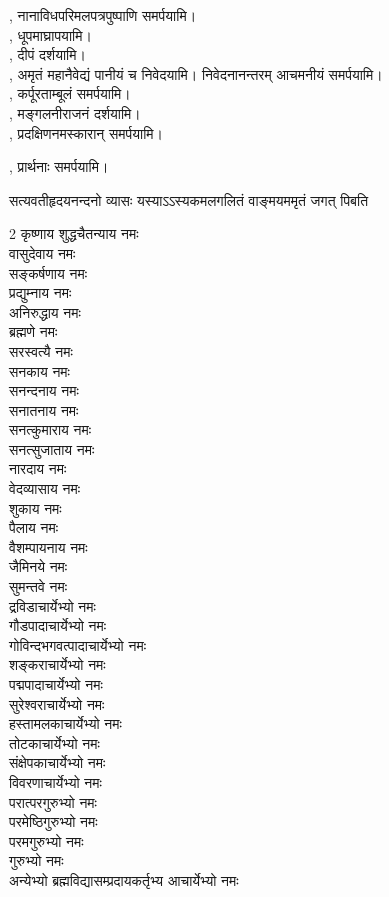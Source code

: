 \acharyebhyonamah{}, नानाविधपरिमल\-पत्र\-पुष्पाणि समर्पयामि।\\
\acharyebhyonamah{}, धूपमाघ्रापयामि।\\
\acharyebhyonamah{}, दीपं दर्शयामि।\\
\acharyebhyonamah{}, अमृतं महानैवेद्यं पानीयं च निवेदयामि। निवेदनानन्तरम् आचमनीयं समर्पयामि।\\
\acharyebhyonamah{}, कर्पूरताम्बूलं समर्पयामि।\\
\acharyebhyonamah{}, मङ्गलनीराजनं दर्शयामि।\\
\acharyebhyonamah{}, प्रदक्षिणनमस्कारान् समर्पयामि।

\acharyebhyonamah{}, प्रार्थनाः समर्पयामि।

{सत्यवतीहृदयनन्दनो व्यासः}
{यस्याऽऽस्यकमलगलितं}
{वाङ्मयममृतं जगत् पिबति}


\begin{flushleft}
\begin{multicols}{2}
कृष्णाय शुद्धचैतन्याय नमः\\
वासुदेवाय नमः\\
सङ्कर्षणाय नमः\\
प्रद्युम्नाय नमः\\
अनिरुद्धाय नमः\\
ब्रह्मणे नमः\\
सरस्वत्यै नमः \\
सनकाय नमः\\
सनन्दनाय नमः \\
सनातनाय नमः \\
सनत्कुमाराय नमः \\
सनत्सुजाताय नमः\\
नारदाय नमः\\
वेदव्यासाय नमः\\
शुकाय नमः\\
पैलाय नमः\\
वैशम्पायनाय नमः\\
जैमिनये नमः\\
सुमन्तवे नमः\\
द्रविडाचार्येभ्यो नमः\\
गौडपादाचार्येभ्यो नमः \\
गो\-विन्द\-भगवत्पादा\-चार्येभ्यो नमः \\
शङ्कराचार्येभ्यो नमः\\
पद्मपादाचार्येभ्यो नमः\\
सुरेश्वराचार्येभ्यो नमः\\
हस्तामलकाचार्येभ्यो नमः\\
तोटकाचार्येभ्यो नमः\\
संक्षेपकाचार्येभ्यो नमः\\
विवरणाचार्येभ्यो नमः\\
परात्परगुरुभ्यो नमः\\
परमेष्ठिगुरुभ्यो नमः\\
परमगुरुभ्यो नमः\\
गुरुभ्यो नमः \\
अन्येभ्यो ब्रह्मविद्या\-सम्प्रदाय\-कर्तृभ्य आचार्येभ्यो नमः \\
\end{multicols}
\end{flushleft}

